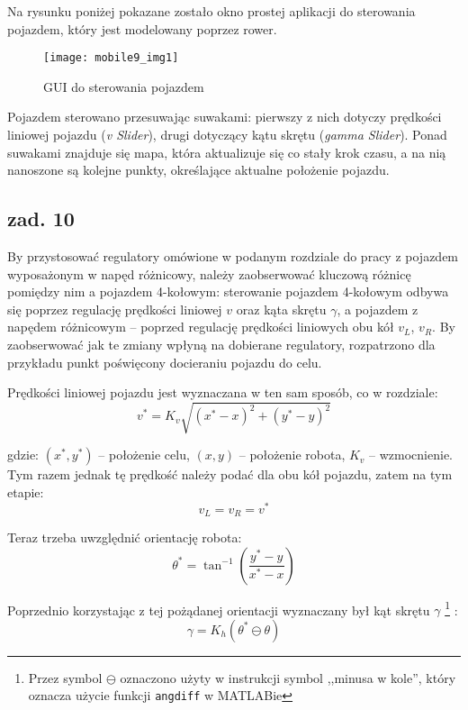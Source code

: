 \documentclass[11pt, a4paper]{article}
\begin{document}
Na rysunku poniżej pokazane zostało okno prostej aplikacji do sterowania pojazdem, który jest modelowany poprzez rower.
\begin{figure}[htbp!]
	\centering
	\texttt{[image: mobile9\_img1]}
	\caption{GUI do sterowania pojazdem}
\end{figure}

Pojazdem sterowano przesuwając suwakami: pierwszy z nich dotyczy prędkości liniowej pojazdu (\emph{v Slider}), drugi dotyczący kątu skrętu (\emph{gamma Slider}). Ponad suwakami znajduje się mapa, która aktualizuje się co stały krok czasu, a na nią nanoszone są kolejne punkty, określające aktualne położenie pojazdu.

\subsection*{zad. 10}

By przystosować regulatory omówione w podanym rozdziale do pracy z pojazdem wyposażonym w napęd różnicowy, należy zaobserwować kluczową różnicę pomiędzy nim a pojazdem 4-kołowym: sterowanie pojazdem 4-kołowym odbywa się poprzez regulację prędkości liniowej $v$ oraz kąta skrętu $\gamma$, a pojazdem z napędem różnicowym -- poprzed regulację prędkości liniowych obu kół $v_L$, $v_R$.
By zaobserwować jak te zmiany wpłyną na dobierane regulatory, rozpatrzono dla przykładu punkt poświęcony docieraniu pojazdu do celu.

Prędkości liniowej pojazdu jest wyznaczana w ten sam sposób, co w rozdziale:
\begin{equation*}
v^{*} = K_v \sqrt{(x^{*} - x)^2 + (y^{*} - y)^2}
\end{equation*}

gdzie: $(x^{*}, y^{*})$ -- położenie celu, $(x, y)$ -- położenie robota, $K_v$ -- wzmocnienie. Tym razem jednak tę prędkość należy podać dla obu kół pojazdu, zatem na tym etapie:
\begin{equation*}
v_L = v_R = v^{*}
\end{equation*}

Teraz trzeba uwzględnić orientację robota:
\begin{equation*}
\theta^{*} = \tan^{-1} \left( \frac{y^{*} - y}{x^{*} - x} \right)
\end{equation*}

Poprzednio korzystając z tej pożądanej orientacji wyznaczany był kąt skrętu $\gamma$%
\footnote{Przez symbol $\ominus$ oznaczono użyty w instrukcji symbol ,,minusa w kole'', który oznacza użycie funkcji \texttt{angdiff} w MATLABie}%
:
\begin{equation*}
\gamma = K_h ( \theta^{*} \ominus \theta )
\end{equation*}
\end{document}
